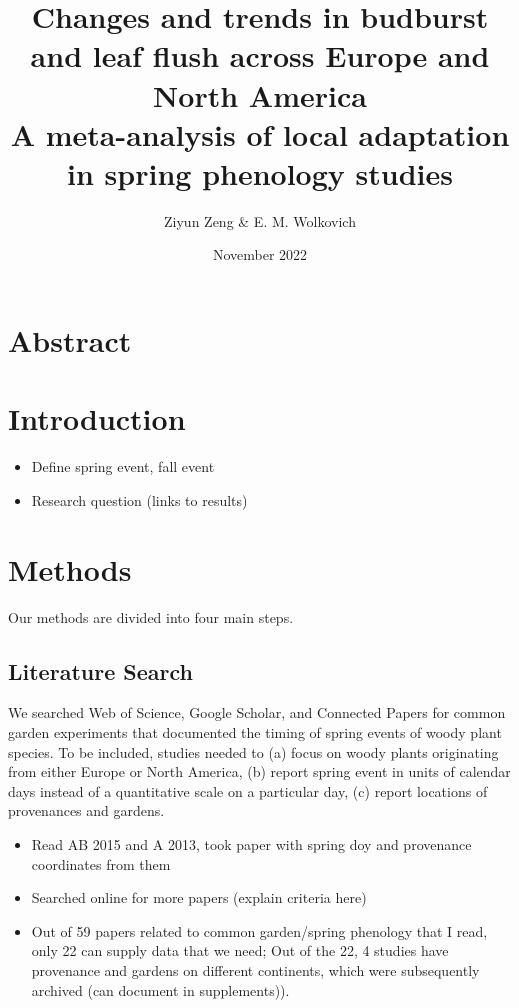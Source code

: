 \documentclass{article}
\begin{document}
\title{{\huge Changes and trends in budburst and leaf flush across Europe and North America} \\A meta-analysis of local adaptation in spring phenology studies}
\author{Ziyun Zeng \& E. M. Wolkovich}
\date{November 2022}
\maketitle 


\newpage

\section*{Abstract}

\section{Introduction}
\begin{itemize}
\item Define spring event, fall event
\item Research question (links to results)
\end{itemize}

\section{Methods}
Our methods are divided into four main steps. 

\subsection{Literature Search}
We searched Web of Science, Google Scholar, and Connected Papers for common garden experiments that documented the timing of spring events of woody plant species. To be included, studies needed to (a) focus on woody plants originating from either Europe or North America, (b) report spring event in units of calendar days instead of a quantitative scale on a particular day, (c) report locations of provenances and gardens.  
  \begin{itemize}
\item Read AB 2015 and A 2013, took paper with spring doy and provenance coordinates from them
\item Searched online for more papers (explain criteria here)
\item Out of 59 papers related to common garden/spring phenology that I read, only 22 can supply data that we need; Out of the 22, 4 studies have provenance and gardens on different continents, which were subsequently archived (can document in supplements)).
\end{itemize}
\end{document}
